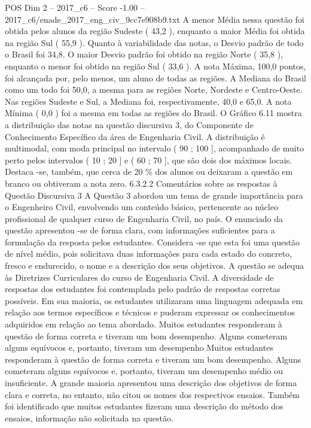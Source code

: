 \begin{textsample}{POS Dim 2 – 2017\_c6 – Score -1.00 – 2017\_c6/enade\_2017\_eng\_civ\_9cc7e908b9.txt}
A menor Média nessa questão foi obtida pelos alunos da região Sudeste ( 43,2 ), enquanto a maior Média foi obtida na região Sul ( 55,9 ).
Quanto à variabilidade das notas, o Desvio padrão de todo o Brasil foi 34,8.
O maior Desvio padrão foi obtido na região Norte ( 35,8 ), enquanto o menor foi obtido na região Sul ( 33,6 ).
A nota Máxima, 100,0 pontos, foi alcançada por, pelo menos, um aluno de todas as regiões.
A Mediana do Brasil como um todo foi 50,0, a mesma para as regiões Norte, Nordeste e Centro-Oeste.
Nas regiões Sudeste e Sul, a Mediana foi, respectivamente, 40,0 e 65,0.
A nota Mínima ( 0,0 ) foi a mesma em todas as regiões do Brasil.
O Gráfico 6.11 mostra a distribuição das notas na questão discursiva 3, do Componente de Conhecimento Específico da área de Engenharia Civil.
A distribuição é multimodal, com moda principal no intervalo ( 90 ; 100 ], acompanhado de muito perto pelos intervalos ( 10 ; 20 ] e ( 60 ; 70 ], que são dois dos máximos locais.
Destaca -se, também, que cerca de 20 \% dos alunos ou deixaram a questão em branco ou obtiveram a nota zero. 6.3.2.2 Comentários sobre as respostas à Questão Discursiva 3 A Questão 3 abordou um tema de grande importância para o Engenheiro Civil, envolvendo um conteúdo básico, pertencente ao núcleo profissional de qualquer curso de Engenharia Civil, no país.
O enunciado da questão apresentou -se de forma clara, com informações suficientes para a formulação da resposta pelos estudantes.
Considera -se que esta foi uma questão de nível médio, pois solicitava duas informações para cada estado do concreto, fresco e endurecido, o nome e a descrição dos seus objetivos.
A questão se adequa às Diretrizes Curriculares do curso de Engenharia Civil.
A diversidade de respostas dos estudantes foi contemplada pelo padrão de respostas corretas possíveis.
Em sua maioria, os estudantes utilizaram uma linguagem adequada em relação aos termos específicos e técnicos e puderam expressar os conhecimentos adquiridos em relação ao tema abordado.
Muitos estudantes responderam à questão de forma correta e tiveram um bom desempenho.
Alguns cometeram alguns equívocos e, portanto, tiveram um desempenho Muitos estudantes responderam à questão de forma correta e tiveram um bom desempenho.
Alguns cometeram alguns equívocos e, portanto, tiveram um desempenho médio ou insuficiente.
A grande maioria apresentou uma descrição dos objetivos de forma clara e correta, no entanto, não citou os nomes dos respectivos ensaios.
Também foi identificado que muitos estudantes fizeram uma descrição do método dos ensaios, informação não solicitada na questão.

\end{textsample}
